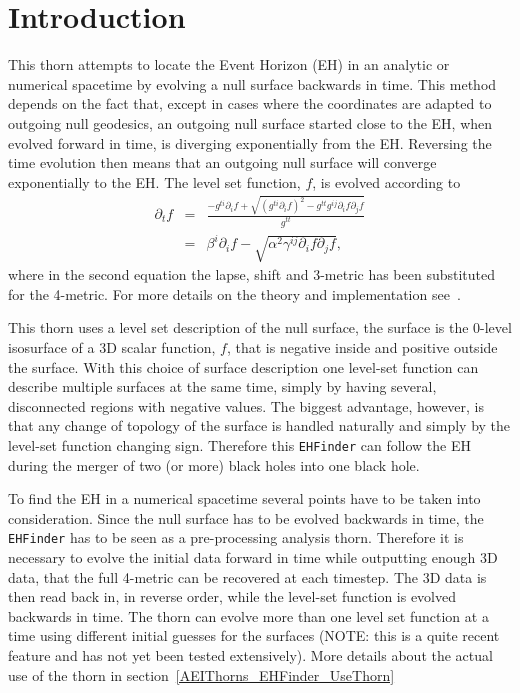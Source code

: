 
\section{Introduction}
This thorn attempts to locate the Event Horizon (EH) in an analytic or
numerical spacetime by evolving a null surface backwards in time. This
method depends on the fact that, except in cases where the coordinates are
adapted to outgoing null geodesics, an outgoing null surface started close
to the EH, when evolved forward in time, is diverging exponentially from the
EH. Reversing the time evolution then means that an outgoing null surface
will converge exponentially to the EH. The level set function, $f$, is
evolved according to
\begin{eqnarray}
\partial_{t}f & = & \frac{-g^{ti}\partial_{i}f+\sqrt{(g^{ti}\partial_{i}f)^{2}-
g^{tt}g^{ij}\partial_{i}f\partial_{j}f}}{g^{tt}} \nonumber \\
 & = & \beta^{i}\partial_{i}f-
                \sqrt{\alpha^{2}\gamma^{ij}\partial_{i}f\partial_{j}f},
\label{AEIThorns_EHFinder_evolve}
\end{eqnarray}
where in the second equation the lapse, shift and 3-metric has been substituted
for the 4-metric. For more details on the theory and implementation
see~\cite{AEIThorns_EHFinder_Diener02}.

This thorn uses a level set description of the null surface, \ie the surface
is the 0-level isosurface of a 3D scalar function, $f$, that is negative
inside and positive outside the surface. With this choice of surface
description one level-set function can describe multiple surfaces at the
same time, simply by having several, disconnected regions with negative
values. The biggest advantage, however, is that any change of topology of
the surface is handled naturally and simply by the level-set function
changing sign. Therefore this {\tt EHFinder} can follow the EH during the
merger of two (or more) black holes into one black hole.

To find the EH in a numerical spacetime several points have to be taken into
consideration. Since the null surface has to be evolved backwards in time, the
{\tt EHFinder} has to be seen as a pre-processing analysis thorn. Therefore it
is necessary to evolve the initial data forward in time while outputting
enough 3D data, that the full 4-metric can be recovered at each timestep.
The 3D data is then read back in, in reverse order, while the level-set
function is evolved backwards in time. The thorn can evolve more than one
level set function at a time using different initial guesses for the surfaces
(NOTE: this is a quite recent feature and has not yet been tested extensively).
More details about the actual use of the thorn in
 section~\ref{AEIThorns_EHFinder_UseThorn}

